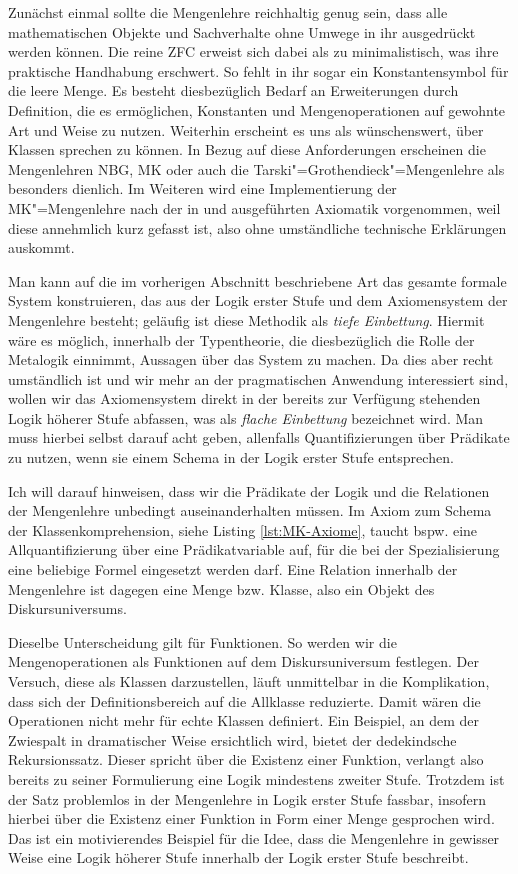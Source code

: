 Zunächst einmal sollte die Mengenlehre reichhaltig genug sein, dass
alle mathematischen Objekte und Sachverhalte ohne Umwege in ihr
ausgedrückt werden können. Die reine ZFC erweist sich dabei als zu
minimalistisch, was ihre praktische Handhabung erschwert. So fehlt in ihr
sogar ein Konstantensymbol für die leere Menge. Es besteht diesbezüglich
Bedarf an Erweiterungen durch Definition, die es ermöglichen,
Konstanten und Mengenoperationen auf gewohnte Art und Weise zu nutzen.
Weiterhin erscheint es uns als wünschenswert, über Klassen sprechen
zu können. In Bezug auf diese Anforderungen erscheinen die Mengenlehren
NBG, MK oder auch die Tarski"=Grothendieck"=Mengenlehre als besonders
dienlich. Im Weiteren wird eine Implementierung der MK"=Mengenlehre%
 nach der in \cite{Kelly} und
\cite{Tianyu-Sun} ausgeführten Axiomatik vorgenommen, weil diese
annehmlich kurz gefasst ist, also ohne umständliche technische
Erklärungen auskommt.

Man kann auf die im vorherigen Abschnitt beschriebene Art das gesamte
formale System konstruieren, das aus der Logik erster Stufe und dem
Axiomensystem der Mengenlehre besteht; geläufig ist diese Methodik
als \emph{tiefe Einbettung}. Hiermit wäre es möglich, innerhalb der
Typentheorie, die diesbezüglich die Rolle der Metalogik einnimmt,
Aussagen über das System zu machen. Da dies aber recht umständlich
ist und wir mehr an der pragmatischen Anwendung interessiert sind, wollen
wir das Axiomensystem direkt in der bereits zur Verfügung stehenden Logik
höherer Stufe abfassen, was als \emph{flache Einbettung} bezeichnet wird.
Man muss hierbei selbst darauf acht geben, allenfalls Quantifizierungen
über Prädikate zu nutzen, wenn sie einem Schema in der Logik erster Stufe
entsprechen.

Ich will darauf hinweisen, dass wir die Prädikate der Logik und die
Relationen der Mengenlehre unbedingt auseinanderhalten müssen. Im Axiom
 zum Schema der Klassenkomprehension, siehe Listing
\ref{lst:MK-Axiome}, taucht bspw. eine Allquantifizierung über eine
Prädikatvariable auf, für die bei der Spezialisierung eine beliebige
Formel eingesetzt werden darf. Eine Relation innerhalb der Mengenlehre
ist dagegen eine Menge bzw. Klasse, also ein Objekt des Diskursuniversums.

Dieselbe Unterscheidung gilt für Funktionen. So werden wir die
Mengenoperationen als Funktionen auf dem Diskursuniversum festlegen.
Der Versuch, diese als Klassen darzustellen, läuft unmittelbar in die
Komplikation, dass sich der Definitionsbereich auf die Allklasse reduzierte.
Damit wären die Operationen nicht mehr für echte Klassen definiert.
Ein Beispiel, an dem der Zwiespalt in dramatischer Weise ersichtlich wird,
bietet der dedekindsche Rekursionssatz. Dieser spricht über die Existenz
einer Funktion, verlangt also bereits zu seiner Formulierung eine Logik
mindestens zweiter Stufe. Trotzdem ist der Satz problemlos in der Mengenlehre
in Logik erster Stufe fassbar, insofern hierbei über die Existenz einer
Funktion in Form einer Menge gesprochen wird. Das ist ein motivierendes
Beispiel für die Idee, dass die Mengenlehre in gewisser Weise eine Logik
höherer Stufe innerhalb der Logik erster Stufe beschreibt.

